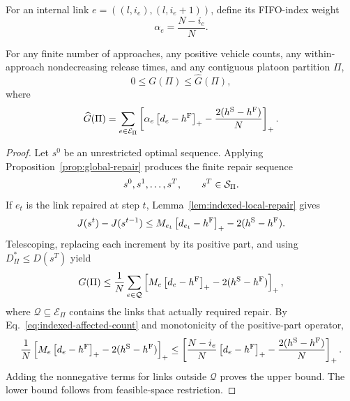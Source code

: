 For an internal link \(e=((l,i_e),(l,i_e+1))\), define its FIFO-index weight
\begin{equation}
\alpha_e=\frac{N-i_e}{N}.
\label{eq:index-weight}
\end{equation}

\begin{theorem}
\label{thm:indexed-loss-bound}
For any finite number of approaches, any positive vehicle counts, any
within-approach nondecreasing release times, and any contiguous platoon
partition \(\Pi\),
\begin{equation}
0\le G(\Pi)\le \widehat{G}(\Pi),
\label{eq:indexed-global-bound}
\end{equation}
where
\begin{equation}
\widehat{G}(\Pi)
=
\sum_{e\in\mathcal{E}_{\Pi}}
\left[
\alpha_e\left[d_e-h^{\mathrm{F}}\right]_{+}
-\frac{2(h^{\mathrm{S}}-h^{\mathrm{F}})}{N}
\right]_{+}.
\label{eq:indexed-partition-bound}
\end{equation}
\end{theorem}

\begin{proof}
Let \(s^0\) be an unrestricted optimal sequence. Applying
Proposition~\ref{prop:global-repair} produces the finite repair sequence
\begin{equation}
s^0,s^1,\ldots,s^T,
\qquad s^T\in\mathcal{S}_{\Pi}.
\end{equation}
If \(e_t\) is the link
repaired at step \(t\), Lemma~\ref{lem:indexed-local-repair} gives
\begin{equation}
J(s^t)-J(s^{t-1})
\le
M_{e_t}\left[d_{e_t}-h^{\mathrm{F}}\right]_{+}-2(h^{\mathrm{S}}-h^{\mathrm{F}}).
\end{equation}
Telescoping, replacing each increment by its positive part, and using
\(D^*_{\Pi}\le D(s^T)\) yield
\begin{equation}
G(\Pi)
\le
\frac{1}{N}
\sum_{e\in\mathcal Q}
\left[
M_e\left[d_e-h^{\mathrm{F}}\right]_{+}-2(h^{\mathrm{S}}-h^{\mathrm{F}})
\right]_{+},
\end{equation}
where \(\mathcal Q\subseteq\mathcal E_\Pi\) contains the links that actually
required repair. By Eq.~\eqref{eq:indexed-affected-count} and monotonicity of
the positive-part operator,
\begin{equation}
\frac{1}{N}
\left[
M_e\left[d_e-h^{\mathrm{F}}\right]_{+}-2(h^{\mathrm{S}}-h^{\mathrm{F}})
\right]_{+}
\le
\left[
\frac{N-i_e}{N}\left[d_e-h^{\mathrm{F}}\right]_{+}
-\frac{2(h^{\mathrm{S}}-h^{\mathrm{F}})}{N}
\right]_{+}.
\end{equation}
Adding the nonnegative terms for links outside \(\mathcal Q\) proves the
upper bound. The lower bound follows from feasible-space restriction.
\end{proof}

